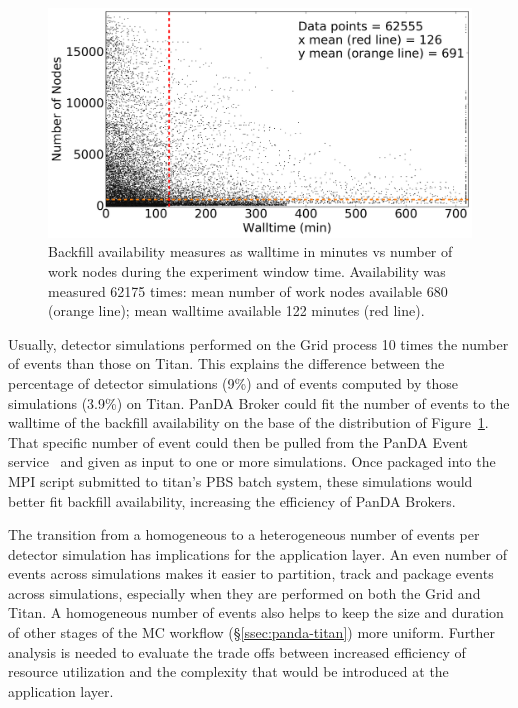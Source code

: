 \begin{figure}[htp]
    \includegraphics[clip,width=\columnwidth]{figures/titan_backfill_avail.png}
    \caption{Backfill availability measures as walltime in minutes vs number of
    work nodes during the experiment window time. Availability was measured
    62175 times: mean number of work nodes available 680 (orange line); mean
    walltime available 122 minutes (red line).}
\label{fig:backfill-distrib}
\end{figure}

Usually, detector simulations performed on the Grid process 10 times the number
of events than those on Titan. This explains the difference between the
percentage of detector simulations (9\%) and of events computed by those
simulations (3.9\%) on Titan. PanDA Broker could fit the number of events to the
walltime of the backfill availability on the base of the distribution of
Figure~\ref{fig:backfill-distrib}. That specific number of event could then be
pulled from the PanDA Event service~\cite{calafiura2015atlas} and given as input
to one or more simulations. Once packaged into the MPI script submitted to
titan's PBS batch system, these simulations would better fit backfill
availability, increasing the efficiency of PanDA Brokers.

The transition from a homogeneous to a heterogeneous number of events per
detector simulation has implications for the application layer. An even number
of events across simulations makes it easier to partition, track and package
events across simulations, especially when they are performed on both the Grid
and Titan. A homogeneous number of events also helps to keep the size and
duration of other stages of the MC workflow (\S\ref{ssec:panda-titan}) more
uniform. Further analysis is needed to evaluate the trade offs between increased
efficiency of resource utilization and the complexity that would be introduced
at the application layer.

